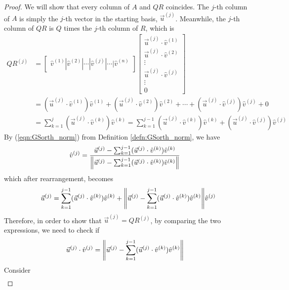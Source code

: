 \begin{proof}
We will show that every column of $A$ and $QR$ coincides. The $j$-th column of $A$ is simply the $j$-th vector in the starting basis, $\vec{u}^{(j)}$. Meanwhile, the $j$-th column of $QR$ is $Q$ times the $j$-th column of $R$, which is
\begin{align*}
QR^{(j)} &=
\begin{bmatrix}
\hat{v}^{(1)}|\hat{v}^{(2)}|\cdots|\hat{v}^{(j)}|\cdots|\hat{v}^{(n)}   
\end{bmatrix}
\begin{bmatrix}
\vec{u}^{(j)} \cdot \hat{v}^{(1)} \\   
\vec{u}^{(j)} \cdot \hat{v}^{(2)} \\   
\vdots \\
\vec{u}^{(j)} \cdot \hat{v}^{(j)} \\
\vdots \\
0
\end{bmatrix} \\
&= (\vec{u}^{(j)} \cdot \hat{v}^{(1)}) \hat{v}^{(1)} + (\vec{u}^{(j)} \cdot \hat{v}^{(2)}) \hat{v}^{(2)} + \cdots + (\vec{u}^{(j)} \cdot \hat{v}^{(j)}) \hat{v}^{(j)} + 0 \\
&= \sum_{k=1}^{j}(\vec{u}^{(j)} \cdot \hat{v}^{(k)})\hat{v}^{(k)} = \sum_{k=1}^{j-1}(\vec{u}^{(j)} \cdot \hat{v}^{(k)})\hat{v}^{(k)} + (\vec{u}^{(j)} \cdot \hat{v}^{(j)})\hat{v}^{(j)}
\end{align*}
By (\ref{eqn:GSorth_norm}) from Definition \ref{defn:GSorth_norm}, we have
\begin{align*}
\hat{v}^{(j)} &= \frac{\vec{u}^{(j)} - \sum_{k=1}^{j-1}(\vec{u}^{(j)} \cdot \hat{v}^{(k)})\hat{v}^{(k)}}{\norm{\vec{u}^{(j)} - \sum_{k=1}^{j-1}(\vec{u}^{(j)} \cdot \hat{v}^{(k)})\hat{v}^{(k)}}}
\end{align*}
\footnotemark{} which after rearrangement, becomes
\begin{align*}
\vec{u}^{(j)} = \sum_{k=1}^{j-1}(\vec{u}^{(j)} \cdot \hat{v}^{(k)})\hat{v}^{(k)} + {\norm{\vec{u}^{(j)} - \sum_{k=1}^{j-1}(\vec{u}^{(j)} \cdot \hat{v}^{(k)})\hat{v}^{(k)}}}\hat{v}^{(j)}
\end{align*}
Therefore, in order to show that $\vec{u}^{(j)} = QR^{(j)}$, by comparing the two expressions, we need to check if
\begin{align*}
\vec{u}^{(j)} \cdot \hat{v}^{(j)} &= \norm{\vec{u}^{(j)} - \sum_{k=1}^{j-1}(\vec{u}^{(j)} \cdot \hat{v}^{(k)})\hat{v}^{(k)}}
\end{align*}
Consider
\begin{align*}

\end{align*}
\end{proof}
